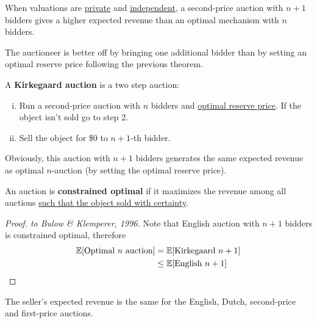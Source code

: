\documentclass{article}
\begin{document}
	\begin{theorem}
		When valuations are \ul{private} and \ul{independent}, a second-price auction with $n+1$ bidders gives a higher expected revenue than an optimal mechanism with $n$ bidders.
	\end{theorem}
	
	\begin{remark}
		The auctioneer is better off by bringing one additional bidder than by setting an optimal reserve price following the previous theorem.
	\end{remark}
	
	\begin{definition}
		A \textbf{Kirkegaard auction} is a two step auction:
		\begin{enumerate}[(i)]
			\item Run a second-price auction with $n$ bidders and \ul{optimal reserve price}. If the object isn't sold go to step 2.
			\item Sell the object for \$0 to $n+1$-th bidder.
		\end{enumerate}
		Obviously, this auction with $n+1$ bidders generates the same expected revenue as optimal $n$-auction (by setting the optimal reserve price).
	\end{definition}

	\begin{definition}
		An auction is \textbf{constrained optimal} if it maximizes the revenue among all auctions \ul{such that the object sold with certainty}.
	\end{definition}
	
	\begin{proof}[Proof. to Bulow \& Klemperer, 1996]
		Note that English auction with $n+1$ bidders is constrained optimal, therefore
		\begin{align}
			\mathbb{E}[{\text{{Optimal $n$ auction}}}] &= \mathbb{E}[{\text{{Kirkegaard  $n+1$}}}] \\
			&\leq \mathbb{E}[{\text{{English  $n+1$}}}]
		\end{align}
	\end{proof}
	
	\begin{corollary}
		The seller's expected revenue is the same for the English, Dutch, second-price and first-price auctions.
	\end{corollary}
	
\end{document}
